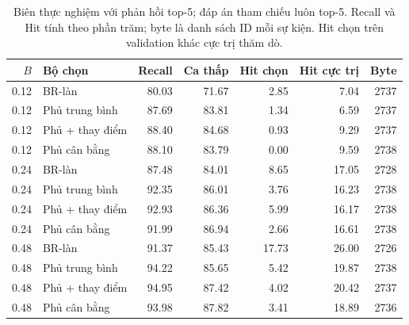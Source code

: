 \begin{table}[htbp]
\centering\small
\setlength{\tabcolsep}{3pt}
\caption{Biên thực nghiệm với phản hồi top-5; đáp án tham chiếu luôn top-5. Recall và Hit tính theo phần trăm; byte là danh sách ID mỗi sự kiện. Hit chọn trên validation khác cực trị thăm dò.}\label{tab:coverage-frontier-5}
\begin{tabular}{rlrrrrr}
\toprule
$B$ & Bộ chọn & Recall & Ca thấp & Hit chọn & Hit cực trị & Byte\\\midrule
0.12 & BR-làn & 80.03 & 71.67 & 2.85 & 7.04 & 2737\\
0.12 & Phủ trung bình & 87.69 & 83.81 & 1.34 & 6.59 & 2737\\
0.12 & Phủ + thay điểm & 88.40 & 84.68 & 0.93 & 9.29 & 2737\\
0.12 & Phủ cân bằng & 88.10 & 83.79 & 0.00 & 9.59 & 2738\\
0.24 & BR-làn & 87.48 & 84.01 & 8.65 & 17.05 & 2728\\
0.24 & Phủ trung bình & 92.35 & 86.01 & 3.76 & 16.23 & 2738\\
0.24 & Phủ + thay điểm & 92.93 & 86.36 & 5.99 & 16.17 & 2738\\
0.24 & Phủ cân bằng & 91.99 & 86.94 & 2.66 & 16.61 & 2738\\
0.48 & BR-làn & 91.37 & 85.43 & 17.73 & 26.00 & 2726\\
0.48 & Phủ trung bình & 94.22 & 85.65 & 5.42 & 19.87 & 2738\\
0.48 & Phủ + thay điểm & 94.95 & 87.42 & 4.02 & 20.42 & 2737\\
0.48 & Phủ cân bằng & 93.98 & 87.82 & 3.41 & 18.89 & 2736\\
\bottomrule
\end{tabular}
\end{table}

